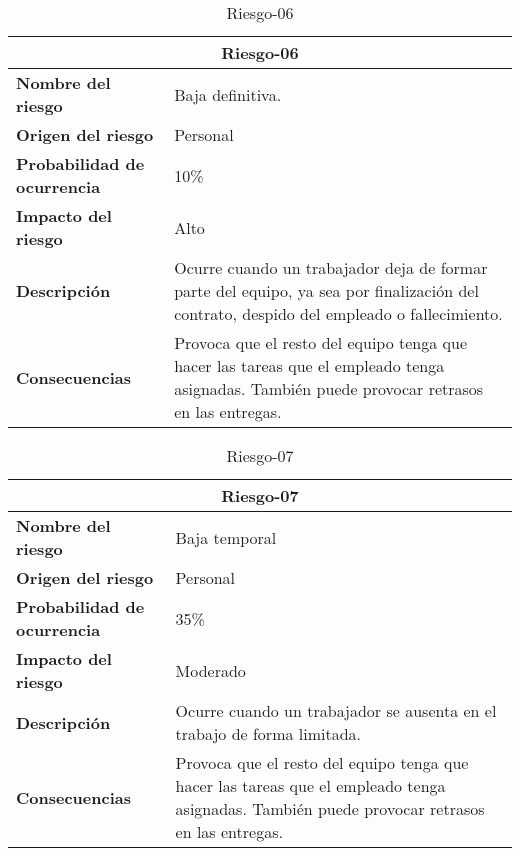\begin{table}[H]
\begin{center}
\begin{tabular}{p{} p{7cm}}
\multicolumn{2}{c}{\textbf{Riesgo-06} } \\
\hline \hline
\textbf{Nombre del riesgo} & Baja definitiva. \\
\hline
\textbf{Origen del riesgo} & Personal\\
\hline
\textbf{Probabilidad de ocurrencia} &10\%\\
\hline
\textbf{Impacto del riesgo} &  Alto \\
\hline
\textbf{Descripción} &  Ocurre cuando un trabajador deja de formar parte del equipo, ya sea por finalización del contrato,  despido del empleado o fallecimiento. \\
\hline
\textbf{Consecuencias} &  Provoca que el resto del equipo tenga que hacer las tareas que el empleado tenga asignadas. También puede provocar retrasos en las entregas. \\
\hline
\end{tabular}
\caption{Riesgo-06}
\label{tab:Riesgo-06}
\end{center}
\end{table}

\begin{table}[H]
\begin{center}
\begin{tabular}{p{} p{7cm}}
\multicolumn{2}{c}{\textbf{Riesgo-07} } \\
\hline \hline
\textbf{Nombre del riesgo} & Baja temporal \\
\hline
\textbf{Origen del riesgo} & Personal\\
\hline
\textbf{Probabilidad de ocurrencia} &  35\% \\
\hline
\textbf{Impacto del riesgo} &  Moderado \\
\hline
\textbf{Descripción} &  Ocurre cuando un trabajador se ausenta en el trabajo de forma limitada. \\
\hline
\textbf{Consecuencias} &  Provoca que el resto del equipo tenga que hacer las tareas que el empleado tenga asignadas. También puede provocar retrasos en las entregas. \\
\hline
\end{tabular}
\caption{Riesgo-07}
\label{tab:Riesgo-07}
\end{center}
\end{table}

